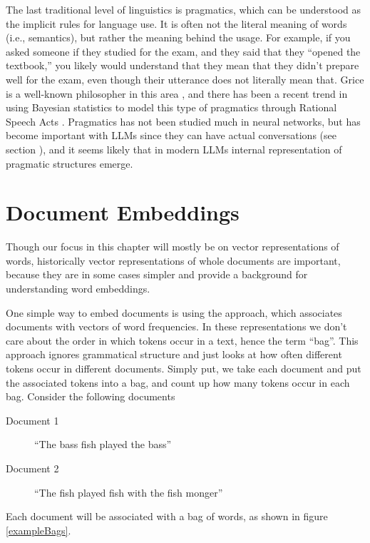 The last traditional level of linguistics is pragmatics, which can be understood as the implicit rules for language use. It is often not the literal meaning of words (i.e., semantics), but rather the meaning behind the usage. For example, if you asked someone if they studied for the exam, and they said that they ``opened the textbook,'' you likely would understand that they mean that they didn't prepare well for the exam, even though their utterance does not literally mean that. Grice is a well-known philosopher in this area \cite{grice1957meaning, grice1975logic}, and there has been a recent trend in using Bayesian statistics to model this type of pragmatics through Rational Speech Acts \cite{goodman2016pragmatic}. Pragmatics has not been studied much in neural networks, but has become important with LLMs since they can have actual conversations (see section ), and it seems likely that in modern LLMs internal representation of pragmatic structures emerge.

\section{Document Embeddings}

Though our focus in this chapter will mostly be on vector representations of words, historically vector representations of whole documents are important, because they are in some cases simpler and provide a background for understanding word embeddings.

One simple way to embed documents is using the  approach, which associates documents with vectors of word frequencies. In these representations we don't care about the order in which tokens occur in a text, hence the term ``bag''. This approach ignores grammatical structure and just looks at how often different tokens occur in different documents. Simply put, we take each document and put the associated tokens into a bag, and count up how many tokens occur in each bag. Consider the following documents

\begin{description}
\item[Document 1]  ``The bass fish played the bass''
\item[Document 2]  ``The fish played fish with the fish monger''
\end{description}

Each document will be associated with a bag of words, as shown in figure \ref{exampleBags}.

